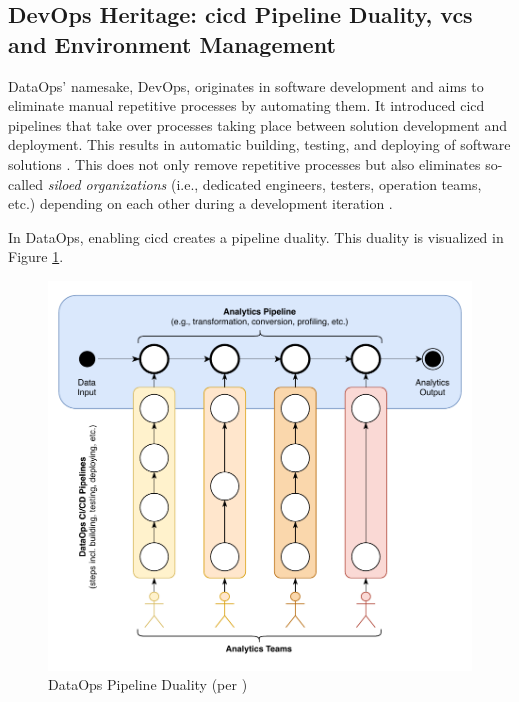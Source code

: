 \subsection{DevOps Heritage: \acs{cicd} Pipeline Duality, \acs{vcs} and Environment Management} \label{sec:2-1-devops}
DataOps' namesake, DevOps, originates in software development and aims to eliminate manual repetitive processes by automating them. It introduced \acf{cicd} pipelines that take over processes taking place between solution development and deployment. This results in automatic building, testing, and deploying of software solutions \cite[21\psqq]{Kaiser}. This does not only remove repetitive processes but also eliminates so-called \textit{siloed organizations} (i.e., dedicated engineers, testers, operation teams, etc.) depending on each other during a development iteration \cite[56]{Bergh2019}.

In DataOps, enabling \ac{cicd} creates a pipeline duality. This duality is visualized in Figure \ref{fig:2-pipeline-duality}.

\newpage

\begin{figure}[h!]
	\centering
	\includegraphics[width=\linewidth]{main-matter/img/2-1-2-pipeline-duality.pdf}
	\caption[DataOps Pipeline Duality]{DataOps Pipeline Duality (per \cite[38\psqq]{Bergh2019})}
	\label{fig:2-pipeline-duality}
\end{figure}

